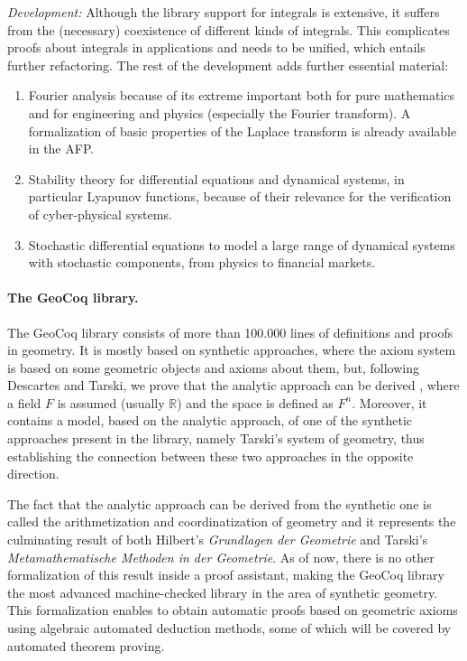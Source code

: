 \emph{Development:}
Although the library support for integrals is extensive, it suffers
from the (necessary) coexistence of different kinds of
integrals. This complicates proofs about integrals in applications and needs
to be unified, which entails further refactoring. The rest of the
development adds further essential material:
\begin{enumerate}
  \item Fourier analysis because of its extreme important both for pure mathematics and for
engineering and physics (especially the Fourier
transform). A formalization of basic properties of the Laplace transform is already available in the AFP.
\item Stability theory for differential equations and
dynamical systems, in particular Lyapunov functions, because of their
relevance for the verification of cyber-physical systems.
\item Stochastic differential equations to model a large range of
dynamical systems with stochastic components, from physics to financial markets.
\end{enumerate}

\paragraph*{The GeoCoq library.}
The GeoCoq library consists of more than 100.000 lines of definitions
and proofs in geometry. It is mostly based on synthetic approaches,
where the axiom system is based on some geometric objects and axioms
about them, but, following Descartes and Tarski, we prove that the
analytic approach can be derived , where a field $F$ is assumed
(usually $\mathbb{R}$) and the space is defined as $F^n$. Moreover, it
contains a model, based on the analytic approach, of one of the
synthetic approaches present in the library, namely Tarski's system of
geometry, thus establishing the connection between these two
approaches in the opposite direction.

The fact that the analytic approach can be derived from the synthetic
one is called the arithmetization and coordinatization of geometry and
it represents the culminating result of both Hilbert's {\em Grundlagen der
Geometrie} and Tarski's {\em Metamathematische Methoden in der
Geometrie}. As of now, there is no other formalization of this result
inside a proof assistant, making the GeoCoq library the most advanced
machine-checked library in the area of synthetic geometry. This
formalization enables to obtain automatic proofs based on geometric
axioms using algebraic automated deduction methods, some of which will
be covered by automated theorem proving.


